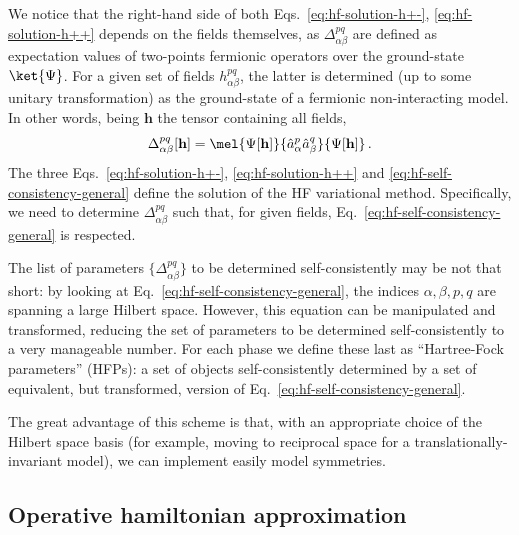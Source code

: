 We notice that the right-hand side of both Eqs.~\eqref{eq:hf-solution-h+-}, \eqref{eq:hf-solution-h++} depends on the fields themselves, as $\Delta_{\alpha\beta}^{pq}$ are defined as expectation values of two-points fermionic operators over the ground-state $\ket{\Psi}$. For a given set of fields $h_{\alpha\beta}^{pq}$, the latter is determined (up to some unitary transformation) as the ground-state of a fermionic non-interacting model. In other words, being $\mathbf{h}$ the tensor containing all fields,
\begin{equation}\label{eq:hf-self-consistency-general}
	\Delta_{\alpha\beta}^{pq}[\mathbf{h}] = \mel{\Psi[\mathbf{h}]}{\hat a_\alpha^p \hat a_\beta^q}{\Psi[\mathbf{h}]} \, .
\end{equation}
The three Eqs.~\eqref{eq:hf-solution-h+-}, \eqref{eq:hf-solution-h++} and \eqref{eq:hf-self-consistency-general} define the solution of the HF variational method. Specifically, we need to determine $\Delta_{\alpha\beta}^{pq}$ such that, for given fields, Eq.~\eqref{eq:hf-self-consistency-general} is respected.

The list of parameters $\lbrace \Delta_{\alpha\beta}^{pq} \rbrace$ to be determined self-consistently may be not that short: by looking at Eq.~\eqref{eq:hf-self-consistency-general}, the indices $\alpha,\beta,p,q$ are spanning a large Hilbert space. However, this equation can be manipulated and transformed, reducing the set of parameters to be determined self-consistently to a very manageable number. For each phase we define these last as ``Hartree-Fock parameters'' (HFPs): a set of objects self-consistently determined by a set of equivalent, but transformed, version of Eq.~\eqref{eq:hf-self-consistency-general}.

The great advantage of this scheme is that, with an appropriate choice of the Hilbert space basis (for example, moving to reciprocal space for a translationally-invariant model), we can implement easily model symmetries.

\subsection{Operative hamiltonian approximation}

